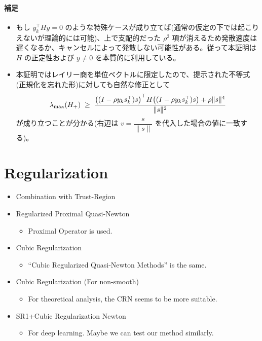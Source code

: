 \documentclass[a4paper, 10pt, dvipdfmx,draft]{article}
\begin{document}
\paragraph{補足}
\begin{itemize}
    \item もし \(y_k^\top H y=0\) のような特殊ケースが成り立てば(通常の仮定の下では起こりえないが理論的には可能)、上で支配的だった \(\rho^2\) 項が消えるため発散速度は遅くなるか、キャンセルによって発散しない可能性がある。従って本証明は \(H\) の正定性および \(y\neq0\) を本質的に利用している。
    \item 本証明ではレイリー商を単位ベクトルに限定したので、提示された不等式(正規化を忘れた形)に対しても自然な修正として
          \[
              \lambda_{\max}(H_{+}) \;\ge\; \frac{\qty((I-\rho y_k s_k^\top)s)^\top H \qty((I-\rho y_k s_k^\top)s) + \rho \|s\|^4}{\|s\|^2}
          \]
          が成り立つことが分かる(右辺は \(v=\dfrac{s}{\|s\|}\) を代入した場合の値に一致する)。
\end{itemize}


\section{Regularization}

\begin{itemize}
    \item[\textbullet] Combination with Trust-Region {\footnotesize\citep{burdakovEfficientlyCombiningLimitedmemory2017}}
    \item[\textbullet] Regularized Proximal Quasi-Newton {\footnotesize\citep{kanzowEfficientRegularizedProximal2022a}}
          \begin{itemize}
              \item Proximal Operator is used.
          \end{itemize}
    \item[\textbullet] Cubic Regularization {\footnotesize\citep{kamzolovCubicRegularizationKey2023}}
          \begin{itemize}
              \item ``Cubic Regularized Quasi-Newton Methods'' is the same.
          \end{itemize}
    \item[\textbullet] Cubic Regularization (For non-smooth) {\footnotesize\citep{wangConvergenceRatesRegularized2025}}
          \begin{itemize}
              \item For theoretical analysis, the CRN seems to be more suitable.
          \end{itemize}
    \item[\textbullet] SR1+Cubic Regularization Newton {\footnotesize\citep{ranganathSymmetricRankOneQuasiNewton2025}}
          \begin{itemize}
              \item For deep learning. Maybe we can test our method similarly.
          \end{itemize}
\end{itemize}




\end{document}
